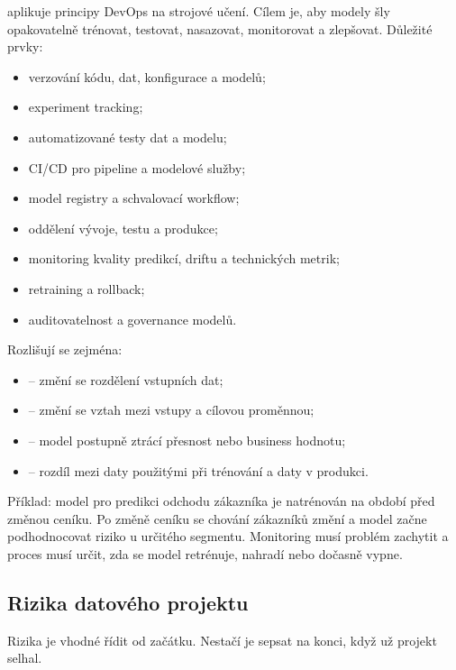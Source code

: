  aplikuje principy DevOps na strojové učení. Cílem je, aby modely šly opakovatelně trénovat, testovat, nasazovat, monitorovat a zlepšovat. Důležité prvky:
\begin{itemize}
  \item verzování kódu, dat, konfigurace a modelů;
  \item experiment tracking;
  \item automatizované testy dat a modelu;
  \item CI/CD pro pipeline a modelové služby;
  \item model registry a schvalovací workflow;
  \item oddělení vývoje, testu a produkce;
  \item monitoring kvality predikcí, driftu a technických metrik;
  \item retraining a rollback;
  \item auditovatelnost a governance modelů.
\end{itemize}

Rozlišují se zejména:
\begin{itemize}
  \item {} -- změní se rozdělení vstupních dat;
  \item {} -- změní se vztah mezi vstupy a cílovou proměnnou;
  \item {} -- model postupně ztrácí přesnost nebo business hodnotu;
  \item {} -- rozdíl mezi daty použitými při trénování a daty v produkci.
\end{itemize}

Příklad: model pro predikci odchodu zákazníka je natrénován na období před změnou ceníku. Po změně ceníku se chování zákazníků změní a model začne podhodnocovat riziko u určitého segmentu. Monitoring musí problém zachytit a proces musí určit, zda se model retrénuje, nahradí nebo dočasně vypne.

\subsection{Rizika datového projektu}
Rizika je vhodné řídit od začátku. Nestačí je sepsat na konci, když už projekt selhal.

